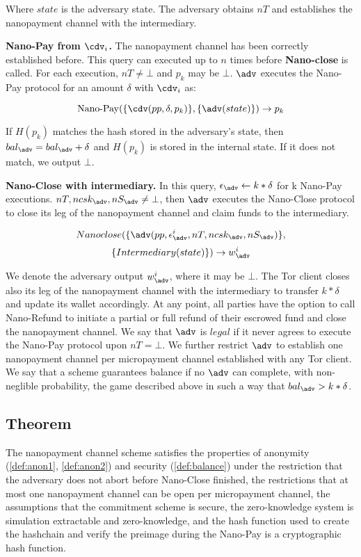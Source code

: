 Where $state$ is the adversary state.
The adversary obtains $nT$ and establishes the nanopayment channel with the intermediary.

\textbf{Nano-Pay from $\cdv_i$.}
The nanopayment channel has been correctly established before.
This query can executed up to $n$ times before \textbf{Nano-close} is called.
For each execution, $nT \neq \bot$ and $p_k$ may be $\bot$.
$\adv$ executes the Nano-Pay protocol for an amount $\delta$ with $\cdv_i$ as:

$$\operatorname{Nano-Pay}(\{\cdv(pp,\delta,p_k)\},\{\adv(state)\}) \rightarrow p_k$$

If $H(p_k)$ matches the hash stored in the adversary's state, then $bal_\adv = bal_\adv+\delta$ and $H(p_k)$ is stored in the internal state.
If it does not match, we output $\bot$.

\textbf{Nano-Close with intermediary.}
In this query, $\epsilon_\adv \leftarrow k*\delta$ for k Nano-Pay executions.
$nT, ncsk_\adv, nS_\adv \neq \bot$, then $\adv$ executes the Nano-Close protocol to close its leg of the nanopayment channel and claim funds to the intermediary.

$$Nano\-close(\{\adv(pp, \epsilon^i_\adv, nT, ncsk_\adv, nS_\adv)\},$$ $$\{Intermediary(state)\}) \rightarrow w^i_\adv$$

We denote the adversary output $w^i_\adv$, where it may be $\bot$.
The Tor client closes also its leg of the nanopayment channel with the intermediary to transfer $k*\delta$ and update its wallet accordingly.
At any point, all parties have the option to call Nano-Refund to initiate a partial or full refund of their escrowed fund and close the nanopayment channel.
We say that $\adv$ is $legal$ if it never agrees to execute the Nano-Pay protocol upon $nT = \bot$.
We further restrict $\adv$ to establish one nanopayment channel per micropayment channel established with any Tor client.
We say that a scheme guarantees balance if no $\adv$ can complete, with non-neglible probability, the game described above in such a way that $bal_\adv > k*\delta$.

\subsection{Theorem}

The nanopayment channel scheme satisfies the properties of anonymity (\ref{def:anon1}, \ref{def:anon2}) and security (\ref{def:balance}) under the restriction that the adversary does not abort before Nano-Close finished, the restrictions that at most one nanopayment channel can be open per micropayment channel, the assumptions that the commitment scheme is secure, the zero-knowledge system is simulation extractable and zero-knowledge, and the hash function used to create the hashchain and verify the preimage during the Nano-Pay is a cryptographic hash function.

